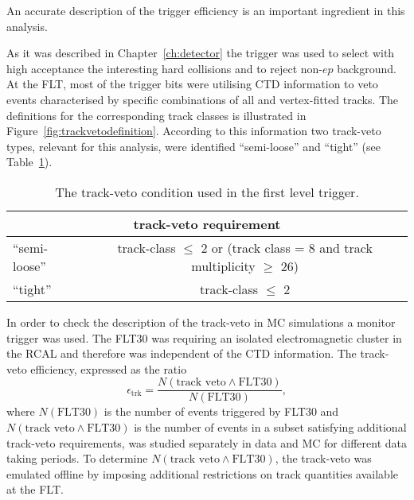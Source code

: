 An accurate description of the trigger efficiency is an important ingredient in this analysis.

As it was described in Chapter~\ref{ch:detector} the \zeus trigger was used to select with high acceptance the interesting hard \ep collisions and to reject non-$ep$ background. At the FLT, most of the trigger bits were utilising CTD information to veto events characterised by specific combinations of all and vertex-fitted tracks. The definitions for the corresponding track classes is illustrated in Figure~\ref{fig:trackvetodefinition}. According to this information two track-veto types, relevant for this analysis, were identified ``semi-loose'' and ``tight'' (see Table~\ref{tab:trackveto}). 
\begin{table}[htpb]
 \centering
 \begin{tabular}{lc}
 \multicolumn{2}{c}{track-veto requirement} \\
  \hline
 ``semi-loose'' & track-class $\le$ 2 or (track class = 8 and track multiplicity $\ge$ 26) \\
 ``tight''      & track-class $\le$ 2 \\
 \end{tabular} 
\caption{The track-veto condition used in the first level trigger.}
\label{tab:trackveto}
\end{table} 
In order to check the description of the track-veto in MC simulations a monitor trigger was used. The FLT30 was requiring an isolated electromagnetic cluster in the RCAL and therefore was independent of the CTD information. The track-veto efficiency, expressed as the ratio
\begin{equation}
 \epsilon_\mathrm{trk} = \frac{N\left(\text{track veto} \wedge \text{FLT30}\right)}{N\left(\text{FLT30}\right)},
\end{equation}
where $N\left(\text{FLT30}\right)$ is the number of events triggered by FLT30 and $N\left(\text{track veto} \wedge \text{FLT30}\right)$ is the number of events in a subset satisfying additional track-veto requirements, was studied separately in data and MC for different data taking periods. To determine $N\left(\text{track veto} \wedge \text{FLT30}\right)$, the track-veto was emulated offline by imposing additional restrictions on track quantities available at the FLT.

